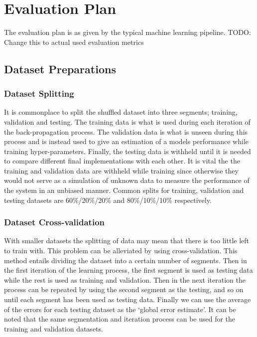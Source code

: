 \chapter{Evaluation Plan} \label{chap:evaluation_plan}

The evaluation plan is as given by the typical machine learning pipeline\cite{IntroToML}. \color{red} TODO: Change this to actual used evaluation metrics \color{black}

\section{Dataset Preparations}

\subsection{Dataset Splitting}

It is commonplace to split the shuffled dataset into  three segments; training, validation and testing. The training data is what is used during each iteration of the back-propagation process. The validation data is what is unseen during this process and is instead used to give an estimation of a models performance while training hyper-parameters. Finally, the testing data is withheld until it is needed to compare different final implementations with each other. It is vital the the training and validation data are withheld while training since otherwise they would not serve as a simulation of unknown data to measure the performance of the system in an unbiased manner. Common splits for training, validation and testing datasets are 60\%/20\%/20\% and 80\%/10\%/10\%  respectively.

\subsection{Dataset Cross-validation}

With smaller datasets the splitting of data may mean that there is too little left to train with. This problem can be alleviated by using cross-validation. This method entails dividing the dataset into a certain number of segments. Then in the first iteration of the learning process, the first segment is used as testing data while the rest is used as training and validation. Then in the next iteration the process can be repeated by using the second segment as the testing, and so on until each segment has been used as testing data. Finally we can use the average of the errors for each testing dataset as the `global error estimate'. It can be noted that the same segmentation and iteration process can be used for the training and validation datasets.

